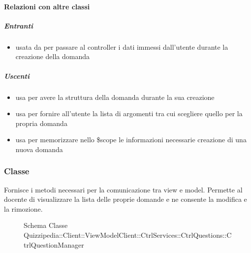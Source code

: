 \paragraph{Relazioni con altre classi}
\subparagraph{Entranti}
\begin{itemize}
\item usata da  per passare al controller i dati immessi dall'utente durante la creazione della domanda
\end{itemize}
\subparagraph{Uscenti}
\begin{itemize}
\item usa  per avere la struttura della domanda durante la sua creazione
\item usa  per fornire all'utente la lista di argomenti tra cui scegliere quello per la propria domanda
\item usa  per memorizzare nello \$scope le informazioni necessarie creazione di una nuova domanda
\end{itemize}
\subsubsection{Classe }
Fornisce i metodi necessari per la comunicazione tra view e model. Permette al docente di visualizzare la lista delle proprie domande e ne consente la modifica e la rimozione.
\begin{figure}[H]
\centering
\noindent{}
\caption[Schema Classe CtrlQuestionManager]{Schema Classe Quizzipedia::Client::ViewModelClient::CtrlServices::CtrlQuestions::CtrlQuestionManager}
\end{figure}
